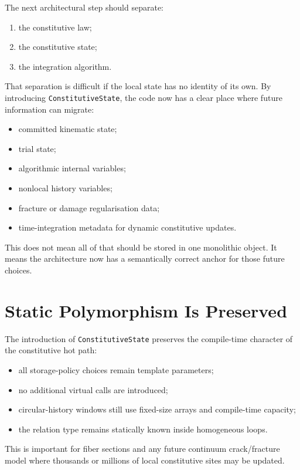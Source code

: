 The next architectural step should separate:

\begin{enumerate}
  \item the constitutive law;
  \item the constitutive state;
  \item the integration algorithm.
\end{enumerate}

That separation is difficult if the local state has no identity of its own.
By introducing \texttt{ConstitutiveState}, the code now has a clear place where
future information can migrate:

\begin{itemize}
  \item committed kinematic state;
  \item trial state;
  \item algorithmic internal variables;
  \item nonlocal history variables;
  \item fracture or damage regularisation data;
  \item time-integration metadata for dynamic constitutive updates.
\end{itemize}

This does not mean all of that should be stored in one monolithic object.  It
means the architecture now has a semantically correct anchor for those future
choices.

\section{Static Polymorphism Is Preserved}

The introduction of \texttt{ConstitutiveState} preserves the compile-time
character of the constitutive hot path:

\begin{itemize}
  \item all storage-policy choices remain template parameters;
  \item no additional virtual calls are introduced;
  \item circular-history windows still use fixed-size arrays and
        compile-time capacity;
  \item the relation type remains statically known inside homogeneous loops.
\end{itemize}

This is important for fiber sections and any future continuum crack/fracture
model where thousands or millions of local constitutive sites may be updated.

